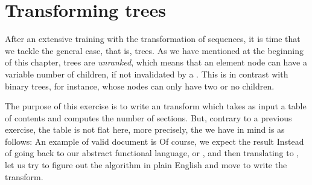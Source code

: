 \section{Transforming trees}

After an extensive training with the transformation of sequences, it
is time that we tackle the general case, that is, trees. As we have
mentioned at the beginning of this chapter, \XML trees are
\emph{unranked}, which means that an element node can have a variable
number of children, if not invalidated by a \DTD. This is in contrast
with binary trees, for instance, whose nodes can only have two or no
children.


The purpose of this exercise is to write an \XSLT transform which
takes as input a table of contents and computes the number of
sections. But, contrary to a previous exercise, the table is not flat
here, more precisely, the \DTD we have in mind is as follows:
\noindent An example of valid \XML document is
\noindent Of course, we expect the result
Instead of going back to our abstract functional language, or \Erlang,
and then translating to \XSLT, let us try to figure out the algorithm
in plain English and move to write the transform.

